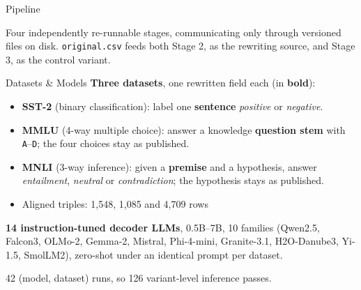 \documentclass[10pt]{beamer}
\begin{document}
\begin{frame}{Pipeline}

  \vspace{0.4em}
  {\scriptsize Four independently re-runnable stages, communicating only through
  versioned files on disk. \texttt{original.csv} feeds both Stage 2, as the
  rewriting source, and Stage 3, as the control variant.}
\end{frame}

\begin{frame}{Datasets \& Models}
  \textbf{Three datasets}, one rewritten field each (in \textbf{bold}):
  \begin{itemize}
    \item \textbf{SST-2} (binary classification): label one \textbf{sentence}
      \emph{positive} or \emph{negative}.
    \item \textbf{MMLU} (4-way multiple choice): answer a knowledge
      \textbf{question stem} with \texttt{A}--\texttt{D}; the four choices stay
      as published.
    \item \textbf{MNLI} (3-way inference): given a \textbf{premise} and a
      hypothesis, answer \emph{entailment}, \emph{neutral} or
      \emph{contradiction}; the hypothesis stays as published.
    \item Aligned triples: 1{,}548, 1{,}085 and 4{,}709 rows
  \end{itemize}
  \vspace{0.4em}
  \textbf{14 instruction-tuned decoder LLMs}, 0.5B--7B, 10 families
  (Qwen2.5, Falcon3, OLMo-2, Gemma-2, Mistral, Phi-4-mini, Granite-3.1,
  H2O-Danube3, Yi-1.5, SmolLM2), zero-shot under an identical prompt per dataset.
  \vspace{0.5em}

  42 (model, dataset) runs, so 126 variant-level inference passes.
\end{frame}
\end{document}
